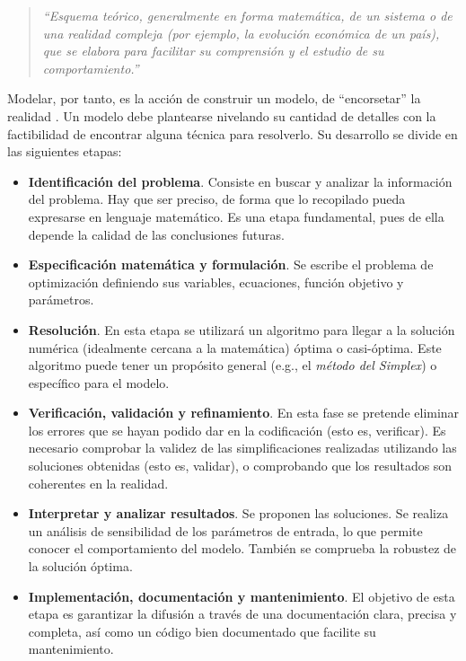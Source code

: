 \documentclass[12pt,a4paper]{book}
\begin{document}
\begin{quote}
\textsl{``Esquema teórico, generalmente en forma matemática, de un sistema o de una realidad compleja (por ejemplo, la evolución económica de un país), que se elabora para facilitar su comprensión y el estudio de su comportamiento.''}
\end{quote}

Modelar, por tanto, es la acción de construir un modelo, de ``encorsetar'' la realidad \cite{linares_modelos_2001}. Un modelo debe plantearse nivelando su cantidad de detalles con la factibilidad de encontrar alguna técnica para resolverlo. Su desarrollo se divide en las siguientes etapas: 

\begin{itemize}
	\item \textbf{Identificación del problema}. Consiste en buscar y analizar la información del problema. Hay que ser preciso, de forma que lo recopilado pueda expresarse en lenguaje matemático. Es una etapa fundamental, pues de ella depende la calidad de las conclusiones futuras. 
    \item \textbf{Especificación matemática y formulación}. Se escribe el problema de optimización definiendo sus variables, ecuaciones, función objetivo y parámetros. 
    \item \textbf{Resolución}. En esta etapa se utilizará un algoritmo para llegar a la solución numérica (idealmente cercana a la matemática) óptima o casi-óptima. Este algoritmo puede tener un propósito general (e.g., el {\sl método del Simplex}) o específico para el modelo. 
    \item \textbf{Verificación, validación y refinamiento}. En esta fase se pretende eliminar los errores que se hayan podido dar en la codificación (esto es, verificar). Es necesario comprobar la validez de las simplificaciones realizadas utilizando las soluciones obtenidas (esto es, validar), o comprobando que los resultados son coherentes en la realidad. 
    \item \textbf{Interpretar y analizar resultados}. Se proponen las soluciones. Se realiza un análisis de sensibilidad de los parámetros de entrada, lo que permite conocer el comportamiento del modelo. También se comprueba la robustez de la solución óptima. 
    \item\textbf{ Implementación, documentación y mantenimiento}. El objetivo de esta etapa es garantizar la difusión a través de una documentación clara, precisa y completa, así como un código bien documentado que facilite su mantenimiento.  
\end{itemize}
\end{document}
